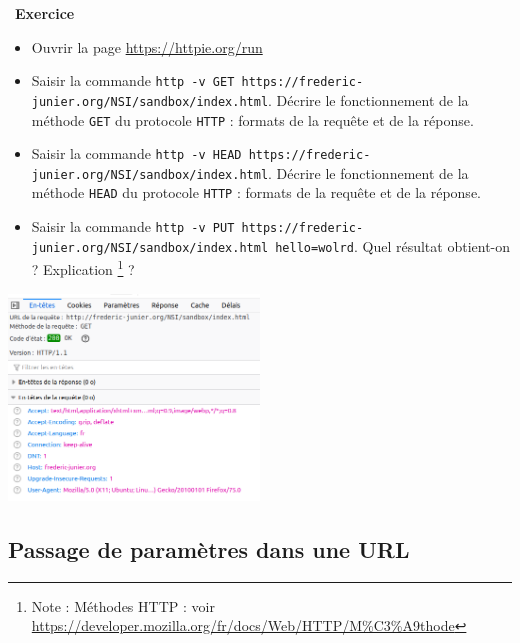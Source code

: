 \documentclass[
  11pt,
]{article}
\newcommand{\passthrough}[1]{#1}
\providecommand{\tightlist}{%
  \setlength{\itemsep}{0pt}\setlength{\parskip}{0pt}}
\newcounter{exo}
\newenvironment{exercice}[1]
{\par \medskip   \addtocounter{exo}{1} \noindent  
\begin{bclogo}[arrondi =0.1,   noborder = true, logo=\bccrayon, marge=4]{~\textbf{Exercice} \textbf{\theexo} {\itshape #1} }  \par}
{
\end{bclogo}
 \par \bigskip }
\begin{document}
\begin{exercice}{}
\begin{enumerate}
  \begin{itemize}
  \tightlist
  \item
    Ouvrir la page \url{https://httpie.org/run}
  \item
    Saisir la commande
    \passthrough{\lstinline!http -v GET https://frederic-junier.org/NSI/sandbox/index.html!}.
    Décrire le fonctionnement de la méthode
    \passthrough{\lstinline!GET!} du protocole
    \passthrough{\lstinline!HTTP!} : formats de la requête et de la
    réponse.
  \item
    Saisir la commande
    \passthrough{\lstinline!http -v HEAD https://frederic-junier.org/NSI/sandbox/index.html!}.
    Décrire le fonctionnement de la méthode
    \passthrough{\lstinline!HEAD!} du protocole
    \passthrough{\lstinline!HTTP!} : formats de la requête et de la
    réponse.
  \item
    Saisir la commande
    \passthrough{\lstinline!http -v PUT https://frederic-junier.org/NSI/sandbox/index.html hello=wolrd!}.
    Quel résultat obtient-on ? Explication \footnote{Note : Méthodes
      HTTP : voir
      \url{https://developer.mozilla.org/fr/docs/Web/HTTP/M\%C3\%A9thode}}
    ?
  \end{itemize}
\end{enumerate}

\includegraphics[width=0.5\textwidth,height=\textheight]{images/header-http1.png}\\

\end{exercice}

\hypertarget{passage-de-paramuxe8tres-dans-une-url}{%
\subsection{Passage de paramètres dans une
URL}\label{passage-de-paramuxe8tres-dans-une-url}}
\end{document}
